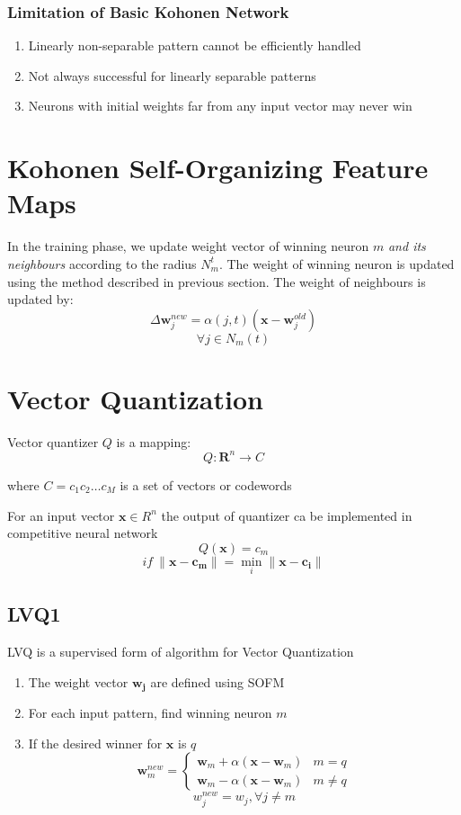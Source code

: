 \subsubsection{Limitation of Basic Kohonen Network}
\begin{enumerate}
\item Linearly non-separable pattern cannot be efficiently handled
\item Not always successful for linearly separable patterns
\item Neurons with initial weights far from any input vector may never win
\end{enumerate}

\section{Kohonen Self-Organizing Feature Maps}
In the training phase, we update weight vector of winning neuron $m$ \emph{and its neighbours} according to the radius $N_m^{t}$. The weight of winning neuron is updated using the method described in previous section. The weight of neighbours is updated by:
$$\Delta \mathbf{w}_j^{new} = \alpha(j,t) (\mathbf{x} - \mathbf{w}_j^{old})$$
$$\forall j \in N_m(t)$$

\section{Vector Quantization}
Vector quantizer $Q$ is a mapping:
$$Q:\mathbf{R}^{n} \rightarrow C$$
\begin{center}where $C={c_1 c_2 \ldots c_M}$ is a set of vectors or codewords\end{center}
For an input vector $\mathbf{x} \in R^{n}$ the output of quantizer ca be implemented in competitive neural network
$$Q(\mathbf{x}) = c_m$$
$$if\ \|\mathbf{x-c_m} \| = \!\min_{i} \| \mathbf{x-c_i} \|$$

\subsection{LVQ1}
LVQ is a supervised form of algorithm for Vector Quantization
\begin{enumerate}
\item The weight vector $\mathbf{w_j}$ are defined using SOFM
\item For each input pattern, find winning neuron $m$
\item If the desired winner for $\mathbf{x}$ is $q$
$$
\mathbf{w}_m^{new} = 
\begin{cases}
\mathbf{w}_m + \alpha (\mathbf{x} - \mathbf{w}_m) & m = q \\
\mathbf{w}_m - \alpha (\mathbf{x} - \mathbf{w}_m) & m \ne q
\end{cases}
$$
$$w_j^{new} = w_j, \forall j \ne m$$
\end{enumerate}

